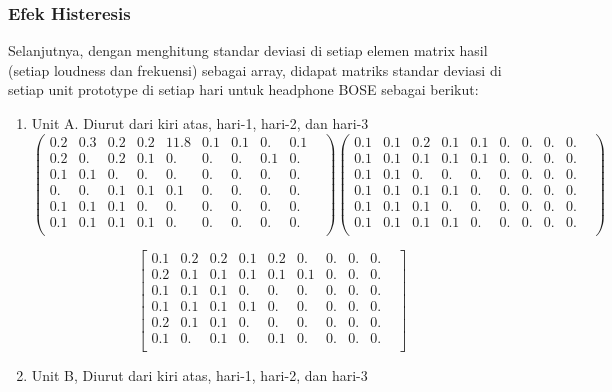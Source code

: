 \documentclass[12pt,]{article}
\begin{document}
	\subsubsection{Efek Histeresis}

	Selanjutnya, dengan menghitung standar deviasi di setiap elemen matrix hasil (setiap loudness dan frekuensi) sebagai array,
	didapat matriks standar deviasi di setiap unit prototype di setiap hari untuk headphone BOSE sebagai berikut:

	\begin{enumerate}
		\item Unit A. Diurut dari kiri atas, hari-1, hari-2, dan hari-3
		\[ \left( \begin{matrix}
			0.2&0.3&0.2&0.2&11.8&0.1&0.1&0.&0.1\\
			0.2&0.&0.2&0.1&0.&0.&0.&0.1&0.&\\
			0.1&0.1&0.&0.&0.&0.&0.&0.&0.&\\
			0.&0.&0.1&0.1&0.1&0.&0.&0.&0.&\\
			0.1&0.1&0.1&0.&0.&0.&0.&0.&0.&\\
			0.1&0.1&0.1&0.1&0.&0.&0.&0.&0.&\\
		\end{matrix} \right)
		\left( \begin{matrix}
			0.1&0.1&0.2&0.1&0.1&0.&0.&0.&0.&\\
			0.1&0.1&0.1&0.1&0.1&0.&0.&0.&0.&\\
			0.1&0.1&0.&0.&0.&0.&0.&0.&0.&\\
			0.1&0.1&0.1&0.1&0.&0.&0.&0.&0.&\\
			0.1&0.1&0.1&0.&0.&0.&0.&0.&0.&\\
			0.1&0.1&0.1&0.1&0.&0.&0.&0.&0.&\\
		\end{matrix} \right)
		\]

		\[\left[
		\begin{matrix}
			0.1&0.2&0.2&0.1&0.2&0.&0.&0.&0.&\\
			0.2&0.1&0.1&0.1&0.1&0.1&0.&0.&0.&\\
			0.1&0.1&0.1&0.&0.&0.&0.&0.&0.&\\
			0.1&0.1&0.1&0.1&0.&0.&0.&0.&0.&\\
			0.2&0.1&0.1&0.&0.&0.&0.&0.&0.&\\
			0.1&0.&0.1&0.&0.1&0.&0.&0.&0.&\\
		\end{matrix}
		\right]\]

		\newpage
		\item Unit B, Diurut dari kiri atas, hari-1, hari-2, dan hari-3


\end{enumerate}
\end{document}
